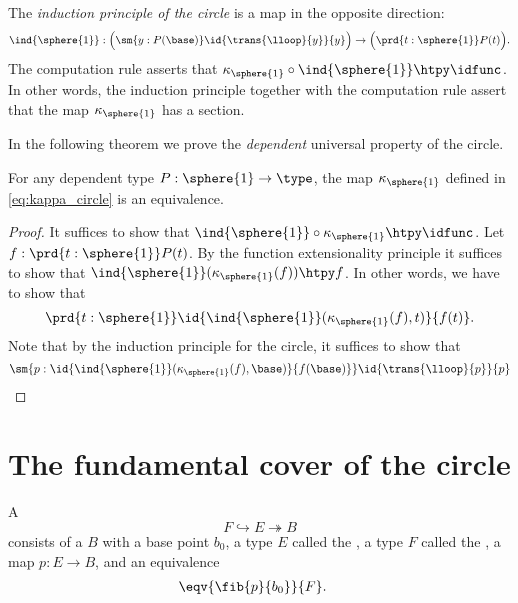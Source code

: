 The \emph{induction principle of the circle} is a map in the opposite direction:
\begin{equation*}
\ind{\sphere{1}}:\Big(\sm{y:P(\base)}\id{\trans{\lloop}{y}}{y}\Big)\to\Big(\prd{t:\sphere{1}} P(t)\Big).
\end{equation*}
The computation rule asserts that $\kappa_{\sphere{1}}\circ\ind{\sphere{1}}\htpy \idfunc$. In other words, the induction principle together with the computation rule assert that the map $\kappa_{\sphere{1}}$ has a section. 

In the following theorem we prove the \emph{dependent} universal property of the circle.

\begin{thm}
For any dependent type $P:\sphere{1}\to\type$, the map $\kappa_{\sphere{1}}$ defined in \autoref{eq:kappa_circle} is an equivalence.
\end{thm}

\begin{proof}
It suffices to show that $\ind{\sphere{1}}\circ\kappa_{\sphere{1}}\htpy\idfunc$. Let $f:\prd{t:\sphere{1}}P(t)$. By the function extensionality principle it suffices to show that $\ind{\sphere{1}}(\kappa_{\sphere{1}}(f))\htpy f$. In other words, we have to show that
\begin{equation*}
\prd{t:\sphere{1}}\id{\ind{\sphere{1}}(\kappa_{\sphere{1}}(f),t)}{f(t)}.
\end{equation*}
Note that by the induction principle for the circle, it suffices to show that
\begin{equation*}
\sm{p:\id{\ind{\sphere{1}}(\kappa_{\sphere{1}}(f),\base)}{f(\base)}}\id{\trans{\lloop}{p}}{p}
\end{equation*}
\end{proof}

\section{The fundamental cover of the circle}

\begin{defn}
A  
\begin{equation*}
F \hookrightarrow E \twoheadrightarrow B
\end{equation*}
consists of a  $B$ with a base point $b_0$, a type $E$ called the , a type $F$ called the , a map $p:E\to B$, and an equivalence
\begin{align*}
& \eqv{\fib{p}{b_0}}{F}.
\end{align*}
\end{defn}

